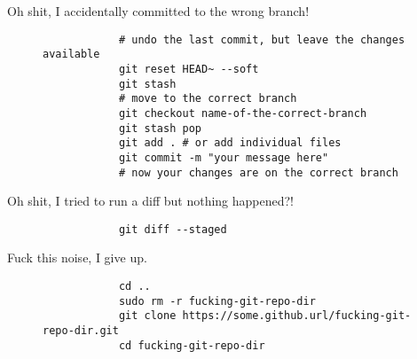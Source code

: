 \begin{frame}[fragile]{Oh shit, I accidentally committed to the wrong branch!}
    \begin{figure}
        \begin{lstlisting}
            # undo the last commit, but leave the changes available
            git reset HEAD~ --soft
            git stash
            # move to the correct branch
            git checkout name-of-the-correct-branch
            git stash pop
            git add . # or add individual files
            git commit -m "your message here"
            # now your changes are on the correct branch
        \end{lstlisting}
    \end{figure}
\end{frame}

\begin{frame}[fragile]{Oh shit, I tried to run a diff but nothing happened?!}
    \begin{figure}
        \begin{lstlisting}
            git diff --staged
        \end{lstlisting}
    \end{figure}
\end{frame}

\begin{frame}[fragile]{Fuck this noise, I give up.}
    \begin{figure}
        \begin{lstlisting}
            cd ..
            sudo rm -r fucking-git-repo-dir
            git clone https://some.github.url/fucking-git-repo-dir.git
            cd fucking-git-repo-dir
        \end{lstlisting}
    \end{figure}
\end{frame}
